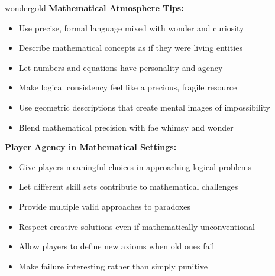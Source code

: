 \documentclass[11pt]{article}
\begin{document}
\begin{campaignsection}[GM Preparation]{wondergold}
\textbf{Mathematical Atmosphere Tips:}
\begin{itemize}
    \item Use precise, formal language mixed with wonder and curiosity
    \item Describe mathematical concepts as if they were living entities
    \item Let numbers and equations have personality and agency
    \item Make logical consistency feel like a precious, fragile resource
    \item Use geometric descriptions that create mental images of impossibility
    \item Blend mathematical precision with fae whimsy and wonder
\end{itemize}

\textbf{Player Agency in Mathematical Settings:}
\begin{itemize}
    \item Give players meaningful choices in approaching logical problems
    \item Let different skill sets contribute to mathematical challenges
    \item Provide multiple valid approaches to paradoxes
    \item Respect creative solutions even if mathematically unconventional
    \item Allow players to define new axioms when old ones fail
    \item Make failure interesting rather than simply punitive
\end{itemize}
\end{campaignsection}

\newpage
\end{document}
